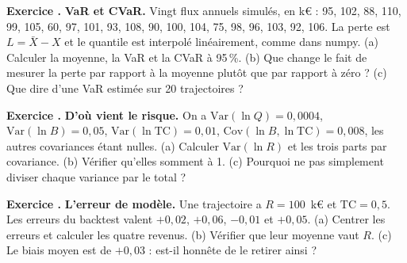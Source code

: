 \documentclass[11pt,a4paper]{article}
\newcommand{\TC}{\mathrm{TC}}
\newcommand{\Cov}{\mathrm{Cov}}
\newcounter{exo}
\newcommand{\lescorriges}{}
\newcommand{\corrigeexo}[2]{\par\medskip\noindent\textbf{Exercice #1.} #2\par}
\newcommand{\exo}[2]{\stepcounter{exo}\par\medskip\noindent\textbf{Exercice \theexo.} #1\par
  \xdef\lescorriges{\unexpanded\expandafter{\lescorriges}\noexpand\corrigeexo{\theexo}{\unexpanded{#2}}}}
\begin{document}
\exo{\textbf{VaR et CVaR.} Vingt flux annuels simulés, en k€ : 95, 102, 88, 110, 99, 105, 60, 97, 101, 93, 108, 90, 100, 104, 75, 98, 96, 103, 92, 106. La perte est $L = \bar X - X$ et le quantile est interpolé linéairement, comme dans numpy. (a) Calculer la moyenne, la VaR et la CVaR à 95\,\%. (b) Que change le fait de mesurer la perte par rapport à la moyenne plutôt que par rapport à zéro ? (c) Que dire d'une VaR estimée sur 20 trajectoires ?}
{(a) $\bar X = 96{,}1$. Les trois plus grandes pertes valent 8,1 ; 21,1 et 36,1. Le quantile à 95\,\% est en position $0{,}95 \times 19 = 18{,}05$ : $21{,}1 + 0{,}05 \times 15 = 21{,}85$~k€. La CVaR est la moyenne des pertes au-delà : 36,1~k€.
\par\noindent (b) On mesure l'écart à ce qui est attendu, pas une perte comptable : un flux toujours positif peut avoir une VaR élevée. C'est cohérent avec un prix juste qui annule l'espérance.
\par\noindent (c) Elle repose sur une ou deux valeurs : très instable. Le projet utilise 1\,000 trajectoires et 8 erreurs, et contrôle la stabilité sur 10 graines.}

\exo{\textbf{D'où vient le risque.} On a $\mathrm{Var}(\ln Q) = 0{,}0004$, $\mathrm{Var}(\ln B) = 0{,}05$, $\mathrm{Var}(\ln \TC) = 0{,}01$, $\Cov(\ln B, \ln \TC) = 0{,}008$, les autres covariances étant nulles. (a) Calculer $\mathrm{Var}(\ln R)$ et les trois parts par covariance. (b) Vérifier qu'elles somment à 1. (c) Pourquoi ne pas simplement diviser chaque variance par le total ?}
{(a) $\mathrm{Var}(\ln R) = 0{,}0004 + 0{,}05 + 0{,}01 + 2 \times 0{,}008 = 0{,}0764$. Parts :
\[
s_Q = \tfrac{0{,}0004}{0{,}0764} = 0{,}5\,\%,\quad s_B = \tfrac{0{,}05 + 0{,}008}{0{,}0764} = 75{,}9\,\%,\quad s_{\TC} = \tfrac{0{,}01 + 0{,}008}{0{,}0764} = 23{,}6\,\%.
\]
\par\noindent (b) $0{,}5 + 75{,}9 + 23{,}6 = 100\,\%$, par linéarité de la covariance.
\par\noindent (c) Les variances seules donnent 0,5 ; 65,4 et 13,1\,\%, avec un reste de 20,9\,\% dû à la covariance, qu'il faudrait expliquer à part. En entretien : le premier risque d'un PPA solaire sur un an est le niveau de prix, pas la météo.}

\exo{\textbf{L'erreur de modèle.} Une trajectoire a $R = 100$~k€ et $\TC = 0{,}5$. Les erreurs du backtest valent $+0{,}02$, $+0{,}06$, $-0{,}01$ et $+0{,}05$. (a) Centrer les erreurs et calculer les quatre revenus. (b) Vérifier que leur moyenne vaut $R$. (c) Le biais moyen est de $+0{,}03$ : est-il honnête de le retirer ainsi ?}
{(a) $\bar e = 0{,}03$, donc $\tilde e = (-0{,}01 ; +0{,}03 ; -0{,}04 ; +0{,}02)$. $R_j = R(\TC - \tilde e_j)/\TC$ : 102, 94, 108 et 96~k€.
\par\noindent (b) $(102 + 94 + 108 + 96)/4 = 100$.
\par\noindent (c) Centrer garde le prix juste du modèle et n'ajoute que la dispersion. Mais le modèle a surestimé le taux de capture en moyenne : le prix peut être trop haut. Il faut le dire, et ne pas présenter la VaR comme corrigeant ce biais.}
\end{document}

